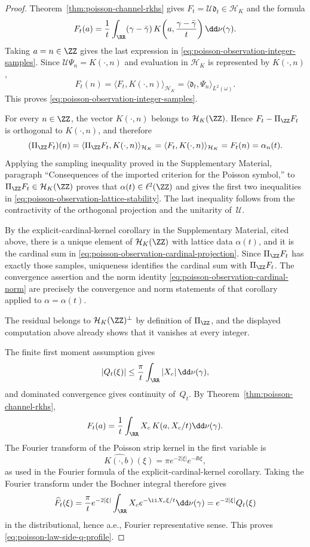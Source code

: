 \begin{proof}
Theorem~\ref{thm:poisson-channel-rkhs} gives
$F_t=\mathcal U\mathfrak d_t\in\mathcal H_K$ and the formula
\[
F_t(a)=\frac1t\int_{\RR}
(\gamma-\bar{\gamma})\,
K\!\left(a,\frac{\gamma-\bar{\gamma}}{t}\right)\dd\nu(\gamma).
\]
Taking $a=n\in\ZZ$ gives the last expression in
\eqref{eq:poisson-observation-integer-samples}.  Since
$\mathcal U\Psi_n=K(\cdot,n)$ and evaluation in $\mathcal H_K$ is
represented by $K(\cdot,n)$,
\[
F_t(n)
=\langle F_t,K(\cdot,n)\rangle_{\mathcal H_K}
=\langle \mathfrak d_t,\Psi_n\rangle_{L^2(\omega)}.
\]
This proves \eqref{eq:poisson-observation-integer-samples}.

For every $n\in\ZZ$, the vector $K(\cdot,n)$ belongs to
$\mathcal H_K(\ZZ)$.  Hence
$F_t-\Pi_{\ZZ}F_t$ is orthogonal to $K(\cdot,n)$, and therefore
\[
(\Pi_{\ZZ}F_t)(n)
=\langle \Pi_{\ZZ}F_t,K(\cdot,n)\rangle_{\mathcal H_K}
=\langle F_t,K(\cdot,n)\rangle_{\mathcal H_K}
=F_t(n)=\alpha_n(t).
\]
Applying the sampling inequality proved in the Supplementary Material,
paragraph ``Consequences of the
imported criterion for the Poisson symbol,'' to
$\Pi_{\ZZ}F_t\in\mathcal H_K(\ZZ)$ proves that
$\alpha(t)\in\ell^2(\ZZ)$ and gives the first two inequalities in
\eqref{eq:poisson-observation-lattice-stability}.  The last inequality
follows from the contractivity of the orthogonal projection and the
unitarity of~$\mathcal U$.

By the explicit-cardinal-kernel corollary in the Supplementary Material,
cited above, there is a unique
element of $\mathcal H_K(\ZZ)$ with lattice data $\alpha(t)$, and it is
the cardinal sum in
\eqref{eq:poisson-observation-cardinal-projection}.  Since
$\Pi_{\ZZ}F_t$ has exactly those samples, uniqueness identifies the
cardinal sum with $\Pi_{\ZZ}F_t$.  The convergence assertion and the norm
identity \eqref{eq:poisson-observation-cardinal-norm} are precisely the
convergence and norm statements of that corollary applied to
$\alpha=\alpha(t)$.

The residual belongs to $\mathcal H_K(\ZZ)^\perp$ by definition of
$\Pi_{\ZZ}$, and the displayed computation above already shows that it
vanishes at every integer.

The finite first moment assumption gives
\[
|Q_t(\xi)|\le \frac{\pi}{t}\int_{\RR}|X_c|\,\dd\nu(\gamma),
\]
and dominated convergence gives continuity of~$Q_t$.  By
Theorem~\ref{thm:poisson-channel-rkhs},
\[
F_t(a)=\frac1t\int_{\RR}X_c\,K(a,X_c/t)\dd\nu(\gamma).
\]
The Fourier transform of the Poisson strip kernel in the first variable is
\[
\widehat{K(\cdot,b)}(\xi)=\pi e^{-2|\xi|}e^{-\ii b\xi},
\]
as used in the Fourier formula of the explicit-cardinal-kernel corollary.
Taking the Fourier transform
under the Bochner integral therefore gives
\[
\widehat F_t(\xi)
=\frac{\pi}{t}e^{-2|\xi|}
\int_{\RR}X_c e^{-\ii X_c\xi/t}\dd\nu(\gamma)
=e^{-2|\xi|}Q_t(\xi)
\]
in the distributional, hence a.e., Fourier representative sense.  This proves
\eqref{eq:poisson-law-side-q-profile}.


\end{proof}
